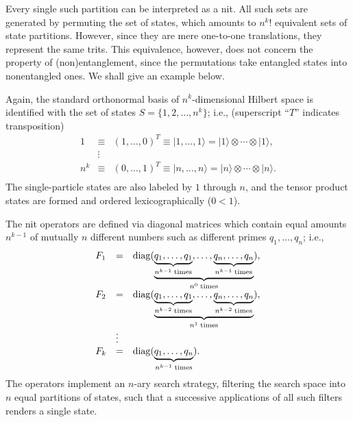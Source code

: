 Every single such partition can be interpreted as a nit.
All such sets are generated by permuting the set of states,
which amounts to $n^k!$ equivalent sets of state partitions.
However, since they are mere one-to-one translations,
they represent the same trits.
This equivalence, however, does not concern the property of (non)entanglement,
since the permutations take entangled states into nonentangled ones.
We shall give an example below.

Again, the standard orthonormal basis of
$n^k$-dimensional Hilbert space is identified with the set of states $S=\{1,2,\ldots ,n^k\}$; i.e.,
(superscript ``$T$'' indicates transposition)
\begin{equation}
\begin{array}{llll}
1 &\equiv& (1,\ldots,0)^T\equiv \mid 1,\ldots ,1\rangle = \mid 1\rangle \otimes \cdots \otimes \mid 1\rangle ,\\
  &\vdots&\\
n^k &\equiv& (0,\ldots,1)^T\equiv \mid n,\ldots ,n\rangle = \mid n\rangle \otimes \cdots \otimes \mid n\rangle .\\
\end{array}
\label{2002-statepart-psma}
\end{equation}
The single-particle states are also labeled by $1$ through $n$,
and the tensor product states are formed and ordered lexicographically ($0<1$).


The nit operators are defined via diagonal matrices
which contain equal amounts $n^{k-1}$ of mutually $n$ different numbers
such as different primes $q_1,\ldots ,q_n$; i.e.,
\begin{equation}
\begin{array}{llll}
F_1&=& {\rm diag} (\underbrace{\underbrace{q_1,\ldots ,q_1}_{n^{k-1}\;{\rm times}},\ldots ,\underbrace{q_n,\ldots ,q_n}_{n^{k-1}\;{\rm times}}}_{n^0\;{\rm times}}),\\
F_2&=& {\rm diag} (\underbrace{\underbrace{q_1,\ldots ,q_1}_{n^{k-2}\;{\rm times}},\ldots ,\underbrace{q_n,\ldots ,q_n}_{n^{k-2}\;{\rm times}}}_{n^1\;{\rm times}}),\\
  &\vdots&\\
F_k&=& {\rm diag} (\underbrace{q_1,\ldots ,q_n}_{n^{k-1}\;{\rm times}}).
\end{array}
\label{2002-statepart-nitopgen}
\end{equation}
The operators implement an $n$-ary search strategy,
filtering the search space into $n$ equal partitions of states,
such that a successive applications of all such filters
renders a single state.

